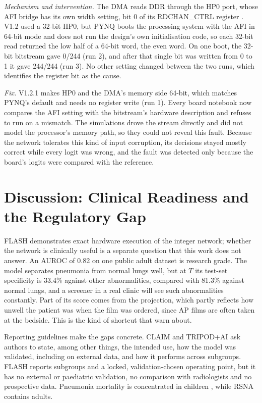 \documentclass[conference]{IEEEtran}
\begin{document}
\textit{Mechanism and intervention.} The DMA reads DDR through the HP0 port, whose AFI bridge has
its own width setting, bit 0 of its RDCHAN\_CTRL register \cite{ug585}. V1.2 used a 32-bit HP0,
but PYNQ boots the processing system with the AFI in 64-bit mode and does not run the design's
own initialisation code, so each 32-bit read returned the low half of a 64-bit word, the even
word. On one boot, the 32-bit bitstream gave 0/244 (run 2), and after that single bit was written
from 0 to 1 it gave 244/244 (run 3). No other setting changed between the two runs, which
identifies the register bit as the cause.

\textit{Fix.} V1.2.1 makes HP0 and the DMA's memory side 64-bit, which matches PYNQ's default and
needs no register write (run 1). Every board notebook now compares the AFI setting with the
bitstream's hardware description and refuses to run on a mismatch. The simulations drove the
stream directly and did not model the processor's memory path, so they could not reveal this
fault. Because the network tolerates this kind of input corruption, its decisions stayed mostly
correct while every logit was wrong, and the fault was detected only because the board's logits
were compared with the reference.

\section{Discussion: Clinical Readiness and the Regulatory Gap}\label{sec:disc}

FLASH demonstrates exact hardware execution of the integer network; whether the network is
clinically useful is a separate question that this work does not answer. An AUROC of 0.82 on one
public adult dataset is research grade. The model separates pneumonia from normal lungs well, but
at $T$ its test-set specificity is 33.4\% against other abnormalities, compared with 81.3\%
against normal lungs, and a screener in a real clinic will see such abnormalities constantly.
Part of its score comes from the projection, which partly reflects how unwell the patient was when
the film was ordered, since AP films are often taken at the bedside. This is the kind of shortcut
that \cite{zech2018,degrave2021,geirhos2020} warn about.

Reporting guidelines make the gaps concrete. CLAIM \cite{mongan2020claim} and TRIPOD+AI
\cite{collins2024tripodai} ask authors to state, among other things, the intended use, how the
model was validated, including on external data, and how it performs across subgroups. FLASH
reports subgroups and a locked, validation-chosen operating point, but it has no external or
paediatric validation, no comparison with radiologists and no prospective data. Pneumonia
mortality is concentrated in children \cite{who2022pneumonia}, while RSNA contains adults.
\end{document}

